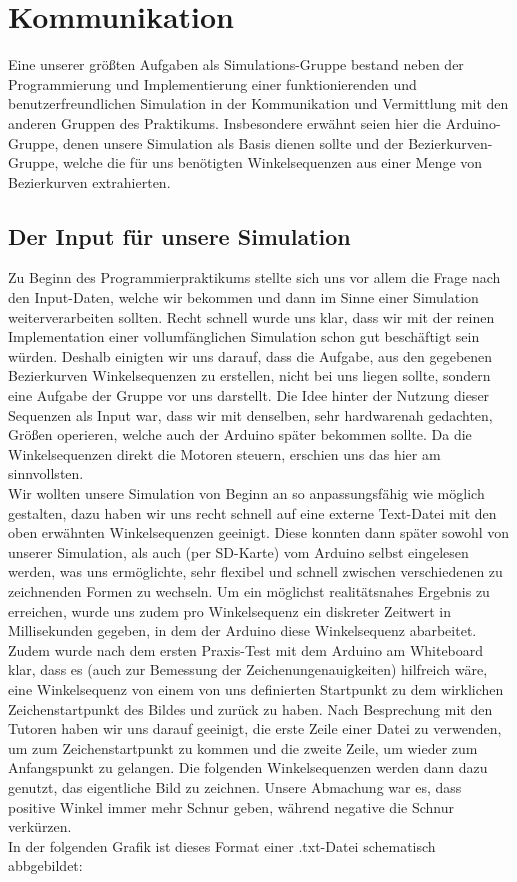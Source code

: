 \section{Kommunikation}
\label{src:kommunikation}
Eine unserer größten Aufgaben als \glqq{}Simulations-Gruppe\grqq{} bestand neben der Programmierung und Implementierung einer funktionierenden und benutzerfreundlichen Simulation in der Kommunikation und Vermittlung mit den anderen Gruppen des Praktikums. Insbesondere erwähnt seien hier die \glqq{}Arduino-Gruppe\grqq{}, denen unsere Simulation als Basis dienen sollte und der \glqq{}Bezierkurven-Gruppe\grqq{}, welche die für uns benötigten Winkelsequenzen aus einer Menge von Bezierkurven extrahierten. 

\subsection{Der Input für unsere Simulation}
\label{sec:input}
Zu Beginn des Programmierpraktikums stellte sich uns vor allem die Frage nach den Input-Daten, welche wir bekommen und dann im Sinne einer Simulation weiterverarbeiten sollten. Recht schnell wurde uns klar, dass wir mit der reinen Implementation einer voll­um­fäng­lichen Simulation schon gut beschäftigt sein würden. Deshalb einigten wir uns darauf, dass die Aufgabe, aus den gegebenen Bezierkurven  Winkelsequenzen zu erstellen, nicht bei uns liegen sollte, sondern eine Aufgabe der Gruppe vor uns darstellt. Die Idee hinter der Nutzung dieser Sequenzen als Input war, dass wir mit denselben, sehr hardwarenah gedachten, Größen operieren, welche auch der Arduino später bekommen sollte. Da die Winkelsequenzen direkt die Motoren steuern, erschien uns das hier am sinnvollsten. \\
Wir wollten unsere Simulation von Beginn an so anpassungsfähig wie möglich gestalten, dazu haben wir uns recht schnell auf eine externe Text-Datei mit den oben erwähnten Winkelsequenzen geeinigt. Diese konnten dann später sowohl von unserer Simulation, als auch (per SD-Karte) vom Arduino selbst eingelesen werden, was uns ermöglichte, sehr flexibel und schnell zwischen verschiedenen zu zeichnenden Formen zu wechseln. Um ein möglichst realitätsnahes Ergebnis zu erreichen, wurde uns zudem pro Winkelsequenz ein diskreter Zeitwert in Millisekunden gegeben, in dem der Arduino diese Winkelsequenz abarbeitet. Zudem wurde nach dem ersten Praxis-Test mit dem Arduino am Whiteboard klar, dass es (auch zur Bemessung der Zeichenungenauigkeiten) hilfreich wäre, eine Winkelsequenz von einem von uns definierten Startpunkt zu dem wirklichen Zeichenstartpunkt des Bildes und zurück zu haben. Nach Besprechung mit den Tutoren haben wir uns darauf geeinigt, die erste Zeile einer Datei zu verwenden, um zum Zeichenstartpunkt zu kommen und die zweite Zeile, um wieder zum Anfangspunkt zu gelangen. Die folgenden Winkelsequenzen werden dann dazu genutzt, das eigentliche Bild zu zeichnen. Unsere Abmachung war es, dass positive Winkel immer mehr Schnur geben, während negative die Schnur verkürzen. \\
In der folgenden Grafik ist dieses Format einer .txt-Datei schematisch abbgebildet: \\

